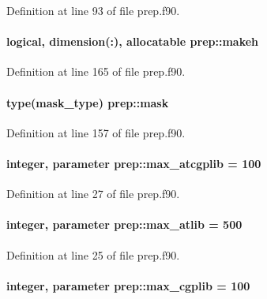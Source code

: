 Definition at line 93 of file prep.\-f90.

\hypertarget{classprep_a675b91e8d296db8b3cfcf39516b278a3}{
\paragraph[{makeh}]{\setlength{\rightskip}{0pt plus 5cm}logical, dimension(\-:), allocatable prep\-::makeh}}\label{classprep_a675b91e8d296db8b3cfcf39516b278a3}


Definition at line 165 of file prep.\-f90.

\hypertarget{classprep_a847c8ade6c795111f259163203927538}{
\paragraph[{mask}]{\setlength{\rightskip}{0pt plus 5cm}type(mask\-\_\-type) prep\-::mask}}\label{classprep_a847c8ade6c795111f259163203927538}


Definition at line 157 of file prep.\-f90.

\hypertarget{classprep_a1e810276f7b8d213da60f190be18113c}{
\paragraph[{max\-\_\-atcgplib}]{\setlength{\rightskip}{0pt plus 5cm}integer, parameter prep\-::max\-\_\-atcgplib = 100}}\label{classprep_a1e810276f7b8d213da60f190be18113c}


Definition at line 27 of file prep.\-f90.

\hypertarget{classprep_a6772647467cb95a41202bbe0a01db5b7}{
\paragraph[{max\-\_\-atlib}]{\setlength{\rightskip}{0pt plus 5cm}integer, parameter prep\-::max\-\_\-atlib = 500}}\label{classprep_a6772647467cb95a41202bbe0a01db5b7}


Definition at line 25 of file prep.\-f90.

\hypertarget{classprep_a72fc2af9b6f9249f3ef63a2f5e570f0a}{
\paragraph[{max\-\_\-cgplib}]{\setlength{\rightskip}{0pt plus 5cm}integer, parameter prep\-::max\-\_\-cgplib = 100}}\label{classprep_a72fc2af9b6f9249f3ef63a2f5e570f0a}


